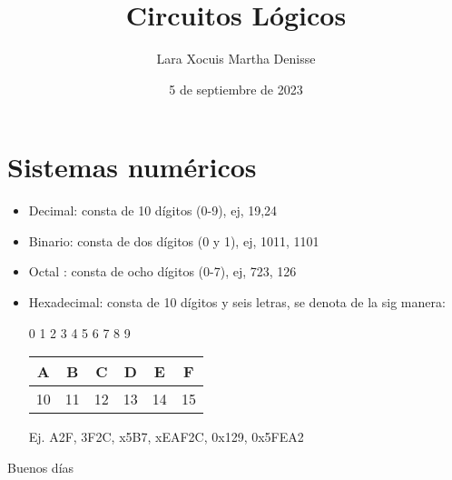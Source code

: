 \documentclass[letterpaper,12pt]{article}
\title {\textbf{Circuitos Lógicos}}
\author{Lara Xocuis Martha Denisse}
\date{5 de septiembre de 2023}
\begin{document}
\begin{sloppypar}
\section{Sistemas numéricos}
\begin{itemize}
    \item Decimal: consta de 10 dígitos (0-9), ej, 19,24 
    \item Binario: consta de dos dígitos (0 y 1), ej, 1011, 1101
    \item Octal : consta de ocho dígitos (0-7), ej, 723, 126
    \item Hexadecimal: consta de 10 dígitos y seis letras, se denota de la sig manera:
    
    0 1 2 3 4 5 6 7 8 9

    \begin{table}[H]
        \centering
        \begin{tabular}{|c|c|c|c|c|c|}
            \hline 
            A & B & C & D & E & F \\ 
            \hline
            10 & 11 & 12 & 13 & 14 & 15 \\ 
            \hline
        \end{tabular}
    \end{table}

    Ej. A2F, 3F2C, x5B7, xEAF2C, 0x129, 0x5FEA2
\end{itemize}

Buenos días

\end{sloppypar}
\end{document}
